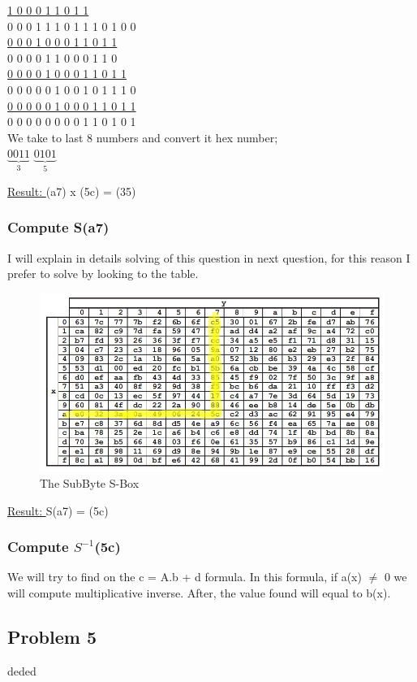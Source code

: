 \documentclass[11pt]{article}
\begin{document}
\underline{1 0 0 0 1 1 0 1 1} \\

0 0 0 1 1 1 0 1 1 1 0 1 0 0 \\

\underline{0 0 0 1 0 0 0 1 1 0 1 1} \\

0 0 0 0 1 1 0 0 0 1 1 0 \\

\underline{0 0 0 0 1 0 0 0 1 1 0 1 1 }\\

0 0 0 0 0 1 0 0 1 0 1 1 1 0\\

\underline{0 0 0 0 0 1 0 0 0 1 1 0 1 1}\\

0 0 0 0 0 0 0 0 1 1 0 1 0 1\\

We take to last 8 numbers and convert it hex number;\\

$\underbrace{0 0 1 1}_\text{3}$ $\underbrace{ 0 1 0 1}_\text{5} $


\underline{Result: }(a7) x (5c) = (35)\\


\subsubsection{Compute S(a7)}

I will explain in details solving of this question in  next question, for this reason I prefer to solve by looking to the table. \\

\begin{figure}[!h]
  \centering
  \includegraphics[width=1\textwidth]{Screenshot_6.png}
  \caption{The SubByte S-Box}
  \label{fig:The SubByte S-Box}
\end{figure}

\underline{Result: }S(a7) = (5c)

\newpage
\subsubsection{Compute $S^{-1}$(5c)}

We will try to find on the c = A.b + d formula. In this formula, if a(x) $\neq$ 0 we will compute multiplicative inverse. After, the value found 
will equal to b(x). 
\subsection{Problem 5}

deded
\end{document}
